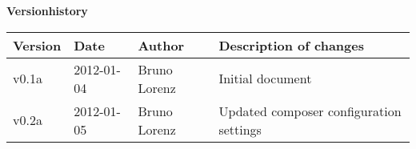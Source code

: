 \noindent \textbf{\Large Versionhistory}\\

\newcommand{\versionrow}[4]{
    \small #1 &
    \small #2 &
    \small #3 &
    \small #4 \\
    \hline
}


\begin{table}[h]
    \begin{tabular*}{\textwidth}{l:l:l:l}
        \hline
        \versionrow{\textbf{Version}}{\textbf{Date}}{\textbf{Author}}{\textbf{Description of changes}}
        \versionrow{v0.1a}{2012-01-04}{Bruno Lorenz}{Initial document}
        \versionrow{v0.2a}{2012-01-05}{Bruno Lorenz}{Updated composer configuration settings}
    \end{tabular*}
\end{table}

